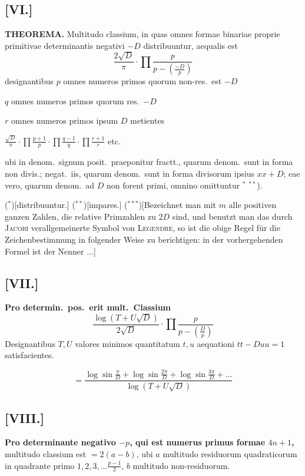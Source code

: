 \documentclass[12pt,a4paper]{article}
\begin{document}
\subsection*{[VI.]}

\textbf{THEOREMA.} Multitudo classium, in quas omnes formae binariae proprie primitivae determinantis negativi $-D$ distribuuntur, aequalis est
\[
\frac{2\sqrt{D}}{\pi}\cdot\prod\frac{p}{p-\left(\frac{-D}{p}\right)}
\]
designantibus $p$ omnes numeros primos quorum non-res.\ est $-D$

$q$ omnes numeros primos quorum res.\ $-D$

$r$ omnes numeros primos ipsum $D$ metientes

$\frac{\sqrt{D}}{\pi}\cdot\prod\frac{p+1}{p}\cdot\prod\frac{q-1}{q}\cdot\prod\frac{r+1}{r}$ etc.

ubi in denom.\ signum posit.\ praeponitur fractt., quarum denom.\ sunt in forma non divis.; negat.\ iis, quarum denom.\ sunt in forma divisorum ipsius $xx+D$; eae vero, quarum denom.\ ad $D$ non forent primi, omnino omittuntur $^{\ast}$ $^{\ast\ast}$).

\begin{center}
($^\ast$)[distribuuntur.] ($^{\ast\ast}$)[impares.] ($^{\ast\ast\ast}$)[Bezeichnet man mit $m$ alle positiven ganzen Zahlen, die relative Primzahlen zu $2D$ sind, und benutzt man das durch \textsc{Jacobi} verallgemeinerte Symbol von \textsc{Legendre}, so ist die obige Regel f\"ur die Zeichenbestimmung in folgender Weise zu berichtigen: in der vorhergehenden Formel ist der Nenner $\ldots$]
\end{center}

\subsection*{[VII.]}

\textbf{Pro determin.\ pos.\ erit mult.\ Classium}
\[
\frac{\log(T+U\sqrt{D})}{2\sqrt{D}} \cdot \prod\frac{p}{p-\left(\frac{D}{p}\right)}
\]
Designantibus $T, U$ valores minimos quantitatum $t, u$ aequationi $tt-Duu=1$ satisfacientes.

\[
= \frac{\log\sin\frac{\pi}{D} + \log\sin\frac{2\pi}{D} + \log\sin\frac{3\pi}{D} + \ldots}{\log(T+U\sqrt{D})}
\]

\subsection*{[VIII.]}

\textbf{Pro determinante negativo $-p$, qui est numerus primus formae $4n+1$,} multitudo classium est $= 2(a-b)$, ubi $a$ multitudo residuorum quadraticorum in quadrante primo $1, 2, 3, \ldots \frac{p-1}{2}$, $b$ multitudo non-residuorum.
\end{document}
